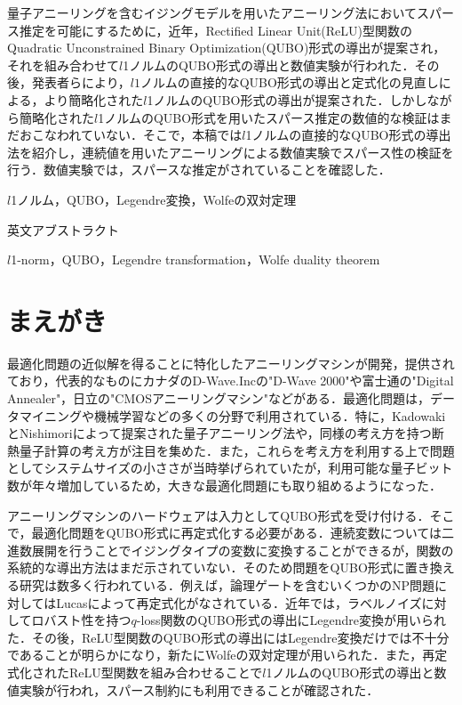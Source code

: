 \documentclass[technicalreport]{ieicej}
\begin{document}
\begin{jabstract}
  量子アニーリングを含むイジングモデルを用いたアニーリング法においてスパース推定を可能にするために，近年，Rectified Linear Unit(ReLU)型関数のQuadratic Unconstrained Binary Optimization(QUBO)形式の導出が提案され，それを組み合わせて$l$1ノルムのQUBO形式の導出と数値実験が行われた．その後，発表者らにより，$l1$ノルムの直接的なQUBO形式の導出と定式化の見直しによる，より簡略化された$l$1ノルムのQUBO形式の導出が提案された．しかしながら簡略化された$l$1ノルムのQUBO形式を用いたスパース推定の数値的な検証はまだおこなわれていない．そこで，本稿では$l$1ノルムの直接的なQUBO形式の導出法を紹介し，連続値を用いたアニーリングによる数値実験でスパース性の検証を行う．数値実験では，スパースな推定がされていることを確認した．
\end{jabstract}
\begin{jkeyword}
$l$1ノルム，QUBO，Legendre変換，Wolfeの双対定理
\end{jkeyword}
\begin{eabstract}
英文アブストラクト
\end{eabstract}
\begin{ekeyword}
$l$1-norm，QUBO，Legendre transformation，Wolfe duality theorem
\end{ekeyword}
\maketitle

\section{まえがき}
最適化問題の近似解を得ることに特化したアニーリングマシンが開発，提供されており，代表的なものにカナダのD-Wave.Inc\cite{d-wave01,d-wave02}の"D-Wave 2000"や富士通\cite{Digital_annealer}の"Digital Annealer"，日立の"CMOSアニーリングマシン"などがある．最適化問題は，データマイニングや機械学習などの多くの分野で利用されている．特に，KadowakiとNishimoriによって提案された量子アニーリング法\cite{Quantum_annealing}や，同様の考え方を持つ断熱量子計算\cite{AQC}の考え方が注目を集めた．また，これらを考え方を利用する上で問題としてシステムサイズの小ささが当時挙げられていたが，利用可能な量子ビット数が年々増加しているため，大きな最適化問題にも取り組めるようになった．

アニーリングマシンのハードウェアは入力としてQUBO形式を受け付ける．そこで，最適化問題をQUBO形式に再定式化する必要がある．連続変数については二進数展開を行うことでイジングタイプの変数に変換することができるが，関数の系統的な導出方法はまだ示されていない．そのため問題をQUBO形式に置き換える研究は数多く行われている．例えば，論理ゲートを含むいくつかのNP問題に対してはLucasによって再定式化がなされている\cite{logic_gate,formulation}．近年では，ラベルノイズに対してロバスト性を持つ$q$-loss関数のQUBO形式の導出にLegendre変換が用いられた\cite{q-loss_formulation}．その後，ReLU型関数のQUBO形式の導出\cite{ReLU_function}にはLegendre変換だけでは不十分であることが明らかになり，新たにWolfeの双対定理\cite{Wolfe_duality}が用いられた．また，再定式化されたReLU型関数を組み合わせることで$l$1ノルムのQUBO形式の導出と数値実験が行われ，スパース制約にも利用できることが確認された\cite{ReLU_simmulate}．
\end{document}
